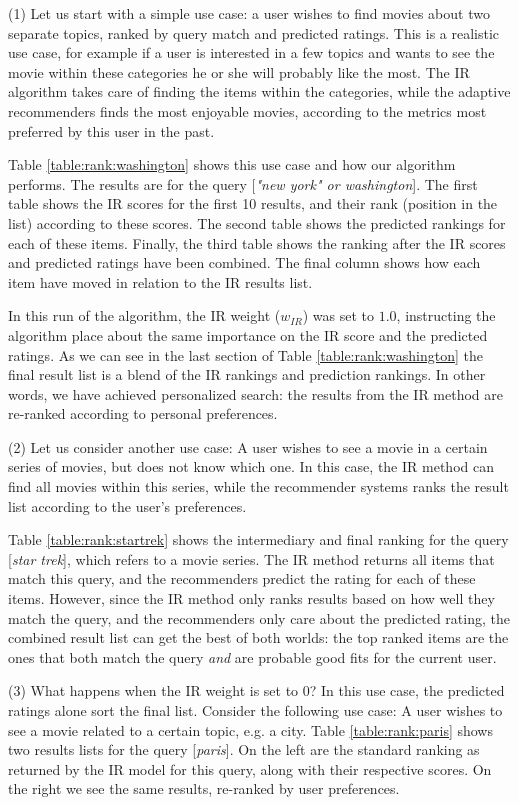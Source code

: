 (1) Let us start with a simple use case:
a user wishes to find movies about two separate topics, ranked by 
query match and predicted ratings.
This is a realistic use case, for example if a user is interested
in a few topics and wants to see the movie within these categories
he or she will probably like the most.
The IR algorithm takes care of finding the items within the categories,
while the adaptive recommenders finds the most enjoyable movies,
according to the metrics most preferred by this user in the past.

Table \ref{table:rank:washington} shows this use case and how our algorithm performs.
The results are for the query [\emph{"new york" or washington}].
The first table shows the IR scores for the first 10 results,
and their rank (position in the list) according to these scores.
The second table shows the predicted rankings for each of these items.
Finally, the third table shows the ranking after the IR scores
and predicted ratings have been combined.
The final column shows how each item have moved in relation to the 
IR results list.

In this run of the algorithm, the IR weight ($w_{IR}$) was set to $1.0$,
instructing the algorithm place about the same importance on the IR score
and the predicted ratings. As we can see in the last section of 
Table \ref{table:rank:washington} the final result list is a blend
of the IR rankings and prediction rankings.
In other words, we have achieved personalized search: the results
from the IR method are re-ranked according to personal preferences.


(2) Let us consider another use case:
A user wishes to see a movie in a certain series of movies,
but does not know which one. In this case, the IR method can find all movies within this series,
while the recommender systems ranks the result list according to the user's preferences.

Table \ref{table:rank:startrek} shows the intermediary and final ranking
for the query [\emph{star trek}], which refers to a movie series.
The IR method returns all items that match this query,
and the recommenders predict the rating for each of these items.
However, since the IR method only ranks results based on how well they match the query,
and the recommenders only care about the predicted rating, the combined result
list can get the best of both worlds:
the top ranked items are the ones that both match the query \emph{and}
are probable good fits for the current user.

(3) What happens when the IR weight is set to $0$?
In this use case, the predicted ratings alone sort the final list.
Consider the following use case:
A user wishes to see a movie related to a certain topic, e.g. a city.
Table \ref{table:rank:paris} shows two results lists for the query [\emph{paris}].
On the left are the standard ranking as returned by the IR model for this query,
along with their respective scores.
On the right we see the same results, re-ranked by user preferences.

